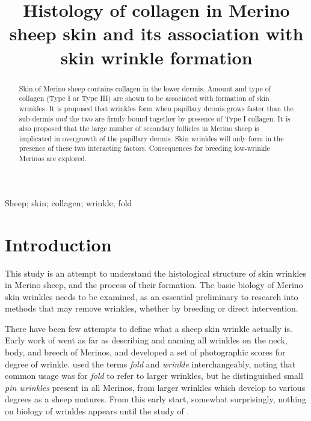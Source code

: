 \documentclass[]{interact}
\theoremstyle{plain}%
\theoremstyle{definition}
\theoremstyle{remark}
\begin{document}

\title{Histology of collagen in Merino sheep skin and its association with skin wrinkle formation}

\author{
}

\maketitle

\begin{abstract}
Skin of Merino sheep contains collagen in the lower dermis. Amount and type of collagen (Type I or Type III) are shown to be associated with formation of skin wrinkles. 
It is proposed that wrinkles form when papillary dermis grows faster than the sub-dermis {\em and} the two are firmly bound together by presence of Type I collagen.  It is also proposed that the large number of secondary follicles in Merino sheep is implicated in overgrowth of the papillary dermis.
Skin wrinkles will only form in the presence of these two interacting factors.
Consequences for breeding low-wrinkle Merinos are explored. 
\end{abstract}

\begin{keywords}
Sheep; skin; collagen; wrinkle; fold 
\end{keywords}


\section{Introduction}

This study  is an attempt to understand the histological structure of skin wrinkles in Merino sheep, and the process of their formation.  The basic biology of Merino skin wrinkles needs to be examined, as an essential preliminary to research into methods that may remove wrinkles, whether by breeding or direct intervention.

There have been few attempts to define what a sheep skin wrinkle actually is. Early work of \citep{carter-1943} went as far as describing and naming all wrinkles on the neck, body, and breech of Merinos, and developed a set of photographic scores for degree of wrinkle. \citeauthor{carter-1943} used the terms {\em fold} and {\em wrinkle} interchangeably, noting that common usage was for {\em fold} to refer to larger wrinkles, but he distinguished small {\em pin wrinkles} present in all Merinos, from larger wrinkles which develop to various degrees as a sheep matures. From this early start,  somewhat surprisingly, nothing on biology of wrinkles  appears until the study of \citep{mitchell-1984}. 
\end{document}

